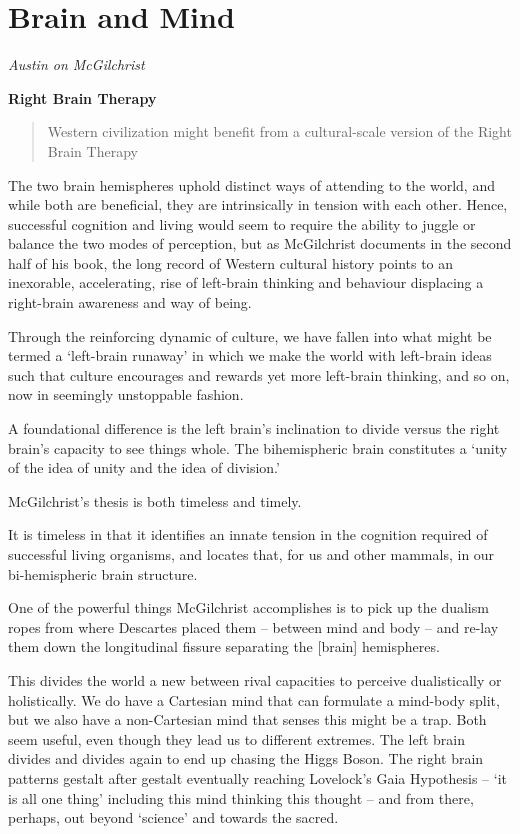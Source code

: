\documentclass[
]{book}
\begin{document}
\hypertarget{brain-and-mind}{%
\chapter{Brain and Mind}\label{brain-and-mind}}

\emph{Austin on McGilchrist}

\textbf{Right Brain Therapy}

\begin{quote}
Western civilization might benefit from a cultural-scale version of the Right Brain Therapy
\end{quote}

The two brain hemispheres uphold distinct ways of attending to the world, and while both are beneficial, they are intrinsically in tension with each other. Hence, successful cognition and living would seem to require the ability to juggle or balance the two modes of perception, but as McGilchrist documents in the second half of his book, the long record of Western cultural history points to an inexorable, accelerating, rise of left-brain thinking and behaviour displacing a right-brain awareness and way of being.

Through the reinforcing dynamic of culture, we have fallen into what might be termed a `left-brain runaway' in which we make the world with left-brain ideas such that culture encourages and rewards yet more left-brain thinking, and so on, now in seemingly unstoppable fashion.

A foundational difference is the left brain's inclination to divide versus the right brain's capacity to see things whole. The bihemispheric brain constitutes a `unity of the idea of unity and the idea of division.'

McGilchrist's thesis is both timeless and timely.

It is timeless in that it identifies an innate tension in the cognition required of successful living organisms, and locates that, for us and other mammals, in our bi-hemispheric brain structure.

One of the powerful things McGilchrist accomplishes is to pick up the dualism ropes from where Descartes placed them -- between mind and body -- and re-lay them down the longitudinal fissure separating the {[}brain{]} hemispheres.

This divides the world a new between rival capacities to perceive dualistically or holistically. We do have a Cartesian mind that can formulate a mind-body split, but we also have a non-Cartesian mind that senses this might be a trap. Both seem useful, even though they lead us to different extremes. The left brain divides and divides again to end up chasing the Higgs Boson. The right brain patterns gestalt after gestalt eventually reaching Lovelock's Gaia Hypothesis -- `it is all one thing' including this mind thinking this thought -- and from there, perhaps, out beyond `science' and towards the sacred.
\end{document}

